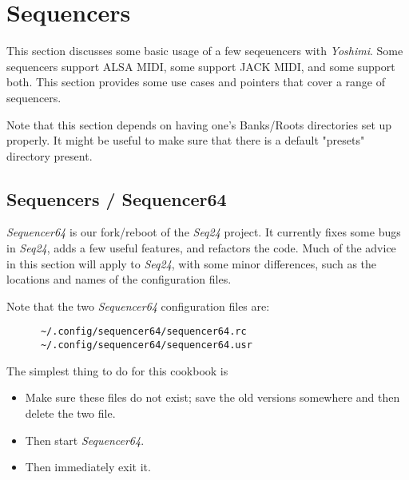 %
%
%

\section{Sequencers}
\label{sec:sequencers}

   This section discusses some basic usage of a few seqeuencers
   with \textsl{Yoshimi}.
   Some sequencers support ALSA MIDI, some support JACK MIDI, and some
   support both.  This section provides some use cases and pointers that cover
   a range of sequencers.

   Note that this section depends on having one's Banks/Roots directories set
   up properly.  It might be useful to make sure that there is a default
   "presets" directory present.

\subsection{Sequencers / Sequencer64}
\label{subsec:sequencers_seq64}

   \textsl{Sequencer64} is our fork/reboot of the \textsl{Seq24} project.
   It currently fixes some bugs in \textsl{Seq24}, adds a few useful features,
   and refactors the code.  Much of the advice in this section will apply to
   \textsl{Seq24}, with some minor differences, such as the locations and names
   of the configuration files.

   Note that the two \textsl{Sequencer64} configuration files are:

   \begin{verbatim}
      ~/.config/sequencer64/sequencer64.rc
      ~/.config/sequencer64/sequencer64.usr
   \end{verbatim}

   The simplest thing to do for this cookbook is
   
   \begin{itemize}
      \item Make sure these files do not exist; save the old versions somewhere
      and then delete the two file.
      \item Then start \textsl{Sequencer64}.
      \item Then immediately exit it.
   \end{itemize}
      
